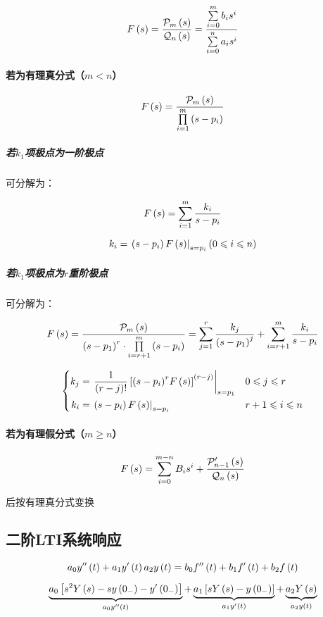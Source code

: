\documentclass{article}
\begin{document}
\[F\left(s\right)=\frac{\mathcal P_m\left(s\right)}{\mathcal Q_n\left(s\right)}
    =\frac{\sum\limits_{i=0}^mb_is^i}{\sum\limits_{i=0}^na_is^i}\]

\paragraph{若为有理真分式（$m<n$）}

\[F\left(s\right)=\frac{\mathcal P_m\left(s\right)}{\prod\limits_{i=1}^m\left(s-p_i\right)}\]

\subparagraph{若$k_1$项极点为一阶极点}

可分解为：

\[F\left(s\right)=\sum_{i=1}^m\frac{k_i}{s-p_i}\]

\[k_i=\left.\left(s-p_i\right)F\left(s\right)\right|_{s=p_i}\left(0\leqslant i\leqslant n\right)\]

\subparagraph{若$k_1$项极点为$r$重阶极点}

可分解为：

\[F\left(s\right)=\frac{\mathcal P_m\left(s\right)}{{\left(s-p_1\right)}^r\cdot\prod\limits_{i=r+1}^m\left(s-p_i\right)}
    =\sum_{j=1}^r\frac{k_j}{{\left(s-p_1\right)}^j}+\sum_{i=r+1}^m\frac{k_i}{s-p_i}\]

\[\left\{\begin{aligned}
        k_j & =\left.\frac1{\left(r-j\right)!}\left[{\left(s-p_i\right)}^rF\left(s\right)\right]^{\left(r-j\right)}\right|_{s=p_1} &  & 0\leqslant j\leqslant r   \\
        k_i & =\left.\left(s-p_i\right)F\left(s\right)\right|_{s=p_i}                                                  &  & r+1\leqslant i\leqslant n
    \end{aligned}\right.\]

\paragraph{若为有理假分式（$m\geqslant n$）}

\[F\left(s\right)=\sum_{i=0}^{m-n}B_is^i+\frac{\mathcal P_{n-1}^\prime\left(s\right)}{\mathcal Q_n\left(s\right)}\]

后按有理真分式变换

\subsection{二阶LTI系统响应}

\[a_0y^{\prime\prime}\left(t\right)+a_1y^\prime\left(t\right)a_2y\left(t\right)
    =b_0f^{\prime\prime}\left(t\right)+b_1f^\prime\left(t\right)+b_2f\left(t\right)\]

\[\underbrace{a_0\left[{s^2Y\left(s\right)-sy\left(0_-\right)-y^\prime\left(0_-\right)}\right]}_{a_0y^{\prime\prime}\left(t\right)}
    +\underbrace{a_1\left[{sY\left(s\right)-y\left(0_-\right)}\right]}_{a_1y^\prime\left(t\right)}
    +\underbrace{a_2Y\left(s\right)}_{a_2y\left(t\right)}\]
\end{document}

